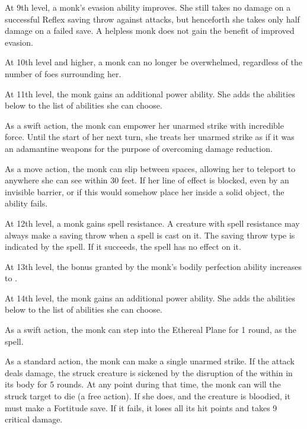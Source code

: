 At 9th level, a monk's evasion ability improves. She still takes no damage on a successful Reflex saving throw against attacks, but henceforth she takes only half damage on a failed save. A helpless monk does not gain the benefit of improved evasion.

 At 10th level and higher, a monk can no longer be overwhelmed, regardless of the number of foes surrounding her.

 At 11th level, the monk gains an additional \ki power ability. She adds the abilities below to the list of abilities she can choose.

 As a swift action, the monk can empower her unarmed strike with incredible force. Until the start of her next turn, she treats her unarmed strike as if it was an adamantine weapons for the purpose of overcoming damage reduction.

 As a move action, the monk can slip between spaces, allowing her to teleport to anywhere she can see within 30 feet. If her line of effect is blocked, even by an invisible barrier, or if this would somehow place her inside a solid object, the ability fails. 

 At 12th level, a monk gains spell resistance. A creature with spell resistance may always make a saving throw when a spell is cast on it. The saving throw type is indicated by the spell. If it succeeds, the spell has no effect on it.

 At 13th level, the bonus granted by the monk's bodily perfection ability increases to .

 At 14th level, the monk gains an additional \ki power ability. She adds the abilities below to the list of abilities she can choose.

 As a swift action, the monk can step into the Ethereal Plane for 1 round, as the  spell.

 As a standard action, the monk can make a single unarmed strike. If the attack deals damage, the struck creature is sickened by the disruption of the \ki within in its body for 5 rounds. At any point during that time, the monk can will the struck target to die (a free action). If she does, and the creature is bloodied, it must make a Fortitude save. If it fails, it loses all its hit points and takes 9 critical damage.

